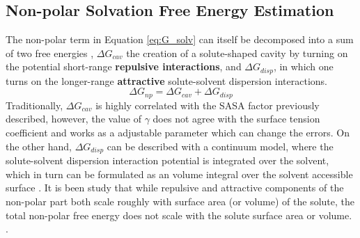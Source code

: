 \subsection{Non-polar Solvation Free Energy Estimation}\label{subsec:CC_method}

The non-polar term in Equation \ref{eq:G_solv} can itself be decomposed into a sum of two free energies \cite{zacharias2003continuum}, $\Delta G_{cav}$ the creation of a solute-shaped cavity by turning on the potential short-range \textbf{repulsive interactions}, and $\Delta G_{disp}$, in which one turns on the longer-range \textbf{attractive} solute-solvent dispersion interactions.
\begin{equation}
    \Delta G_{np}=\Delta G_{cav} + \Delta G_{disp}
    \label{eq:G_np}
\end{equation}
Traditionally, $\Delta G_{cav}$ is highly correlated with the SASA factor previously described, however, the value of $\gamma$ does not agree with the surface tension coefficient and works as a adjustable parameter which can change the errors. On the other hand, $\Delta G_{disp}$ can be described with a continuum model, where the solute-solvent dispersion interaction potential is integrated over the solvent, which in turn can be formulated as an volume integral over the solvent accessible surface \cite{tan2007implicit}.
It is been study that while repulsive and attractive components of the non-polar part both scale roughly with surface area (or volume) of the solute, the total non-polar free energy does not scale with the solute surface area or volume. \cite{mobley2009small}.

